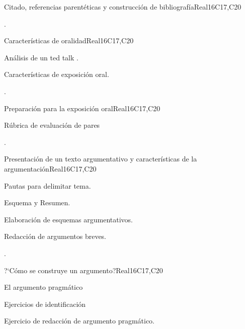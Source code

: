 \begin{syllabus}
\begin{unit}{Citado, referencias parentéticas y construcción de bibliografía}{}{Real}{16}{C17,C20}
  \begin{learningoutcomes}
   \item .%
  \end{learningoutcomes}
\end{unit}

\begin{unit}{Características de oralidad}{}{Real}{16}{C17,C20}
  \begin{topics}
      \item Análisis de un ted talk .
      \item Características de exposición oral.
  \end{topics}

  \begin{learningoutcomes}
   \item .%
  \end{learningoutcomes}
\end{unit}

\begin{unit}{Preparación para la exposición oral}{}{Real}{16}{C17,C20}
  \begin{topics}
      \item Rúbrica de evaluación de pares
  \end{topics}

  \begin{learningoutcomes}
   \item .%
  \end{learningoutcomes}
\end{unit}

\begin{unit}{Presentación de un texto argumentativo y características de la argumentación}{}{Real}{16}{C17,C20}
  \begin{topics}
      \item Pautas para delimitar tema.
      \item Esquema y Resumen.
      \item Elaboración de esquemas argumentativos.
      \item Redacción de argumentos breves.
  \end{topics}

  \begin{learningoutcomes}
   \item .%
  \end{learningoutcomes}
\end{unit}

\begin{unit}{?`Cómo se construye un argumento?}{}{Real}{16}{C17,C20}
  \begin{topics}
      \item El argumento pragmático
      \item Ejercicios de identificación 
      \item Ejercicio de redacción de argumento pragmático.
  \end{topics}


\end{unit}
\end{syllabus}

